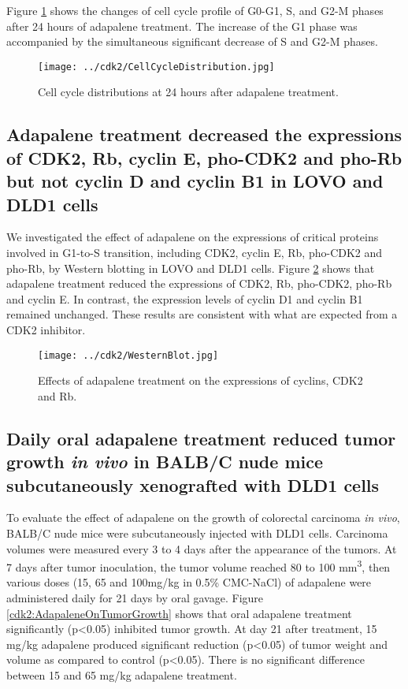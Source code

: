 Figure \ref{cdk2:CellCycleDistribution} shows the changes of cell cycle profile of G0-G1, S, and G2-M phases after 24 hours of adapalene treatment. The increase of the G1 phase was accompanied by the simultaneous significant decrease of S and G2-M phases.

\begin{figure}
\centering
\texttt{[image: ../cdk2/CellCycleDistribution.jpg]}
\caption{Cell cycle distributions at 24 hours after adapalene treatment.}
\label{cdk2:CellCycleDistribution}
\end{figure}

\subsection{Adapalene treatment decreased the expressions of CDK2, Rb, cyclin E, pho-CDK2 and pho-Rb but not cyclin D and cyclin B1 in LOVO and DLD1 cells}

We investigated the effect of adapalene on the expressions of critical proteins involved in G1-to-S transition, including CDK2, cyclin E, Rb, pho-CDK2 and pho-Rb, by Western blotting in LOVO and DLD1 cells. Figure \ref{cdk2:WesternBlot} shows that adapalene treatment reduced the expressions of CDK2, Rb, pho-CDK2, pho-Rb and cyclin E. In contrast, the expression levels of cyclin D1 and cyclin B1 remained unchanged. These results are consistent with what are expected from a CDK2 inhibitor.

\begin{figure}
\centering
\texttt{[image: ../cdk2/WesternBlot.jpg]}
\caption{Effects of adapalene treatment on the expressions of cyclins, CDK2 and Rb.}
\label{cdk2:WesternBlot}
\end{figure}

\subsection{Daily oral adapalene treatment reduced tumor growth \textit{in vivo} in BALB/C nude mice subcutaneously xenografted with DLD1 cells}

To evaluate the effect of adapalene on the growth of colorectal carcinoma \textit{in vivo}, BALB/C nude mice were subcutaneously injected with DLD1 cells. Carcinoma volumes were measured every 3 to 4 days after the appearance of the tumors. At 7 days after tumor inoculation, the tumor volume reached 80 to 100 mm\textsuperscript{3}, then various doses (15, 65 and 100mg/kg in 0.5\% CMC-NaCl) of adapalene were administered daily for 21 days by oral gavage. Figure \ref{cdk2:AdapaleneOnTumorGrowth} shows that oral adapalene treatment significantly (p<0.05) inhibited tumor growth. At day 21 after treatment, 15 mg/kg adapalene produced significant reduction (p<0.05) of tumor weight and volume as compared to control (p<0.05). There is no significant difference between 15 and 65 mg/kg adapalene treatment.

